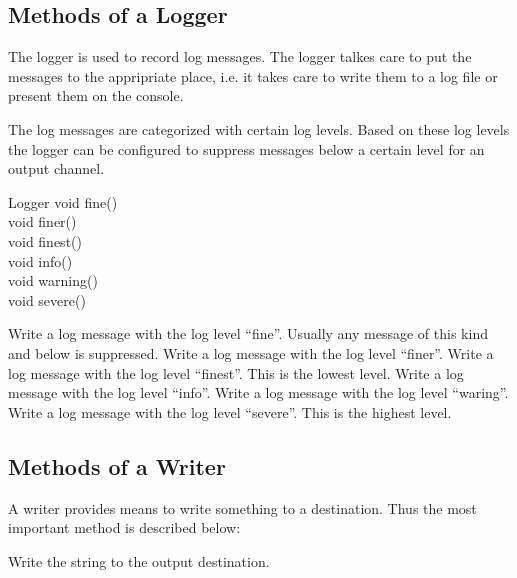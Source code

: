 \subsection{Methods of a Logger}\label{sec:groovy.logger}

The logger is used to record log messages. The logger talkes care to
put the messages to the appripriate place, i.e. it takes care to write
them to a log file or present them on the console.

The log messages are categorized with certain log levels. Based on
these log levels the logger can be configured to suppress messages
below a certain level for an output channel.

\begin{UMLclass}{Logger}
  void fine()\\
  void finer()\\
  void finest()\\
  void info()\\
  void warning()\\
  void severe()
\end{UMLclass}

\begin{methods}
    Write a log message with the log level ``fine''. Usually any
    message of this kind and below is suppressed.
    Write a log message with the log level ``finer''.
    Write a log message with the log level ``finest''. This is the
    lowest level.
    Write a log message with the log level ``info''.
    Write a log message with the log level ``waring''.
    Write a log message with the log level ``severe''. This is the
    highest level.
\end{methods}

\subsection{Methods of a Writer}\label{sec:groovy.writer}

A writer provides means to write something to a destination. Thus the
most important method is described below:

\begin{methods}
    Write the string to the output destination.
\end{methods}


